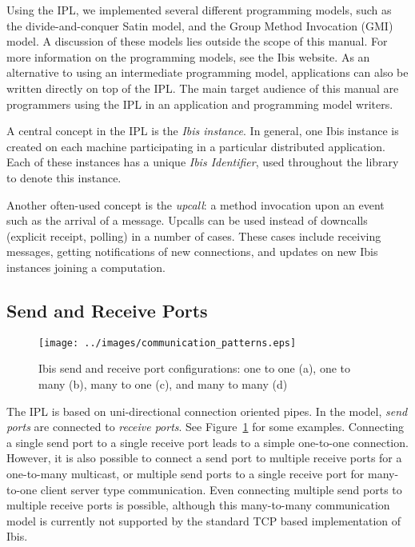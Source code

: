 \documentclass[10pt]{article}
\begin{document}
Using the IPL, we implemented several different programming models, such
as the divide-and-conquer Satin model, and the Group Method
Invocation (GMI) model. A discussion of these models lies outside the
scope of this manual. For more information on the programming models,
see the Ibis website. As an alternative to using an intermediate
programming model, applications can also be written directly on top of
the IPL. The main target audience of this manual are programmers using
the IPL in an application and programming model writers.

A central concept in the IPL is the \emph{Ibis instance}. In general,
one Ibis instance is created on each machine participating in a
particular distributed application. Each of these instances has a unique
\emph{Ibis Identifier}, used throughout the library to denote this
instance.

Another often-used concept is the \emph{upcall}: a method invocation
upon an event such as the arrival of a message. Upcalls can be used
instead of downcalls (explicit receipt, polling) in a number of cases.
These cases include receiving messages, getting notifications of new
connections, and updates on new Ibis instances joining a computation.

\subsection{Send and Receive Ports}


\begin{figure} \centering
\texttt{[image: ../images/communication\_patterns.eps]}
\caption{\label{ports}Ibis send and receive port configurations: one to one (a), one to many (b), many to one (c), and many to many (d)}
\end{figure}

The IPL is based on uni-directional connection oriented pipes. In the
model, \emph{send ports} are connected to \emph{receive ports}. See
Figure~\ref{ports} for some examples. Connecting a single send port to a
single receive port leads to a simple one-to-one connection. However, it is
also possible to connect a send port to multiple receive ports for a
one-to-many multicast, or multiple send ports to a single receive port
for many-to-one client server type communication. Even connecting
multiple send ports to multiple receive ports is possible, although this
many-to-many communication model is currently not supported by the
standard TCP based implementation of Ibis.
\end{document}
